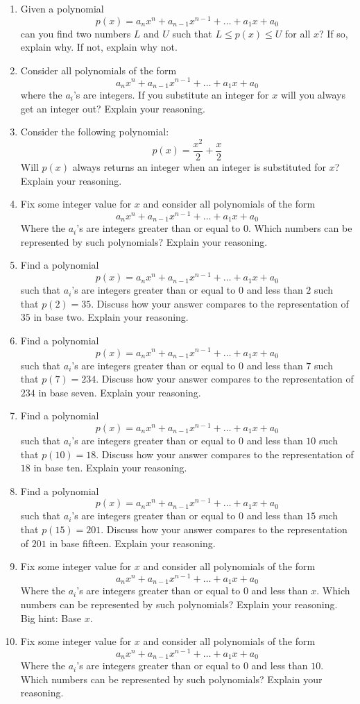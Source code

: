 \begin{problems}
\begin{enumerate}
\item Given a polynomial
\[
p(x) = a_nx^n + a_{n-1}x^{n-1} + \dots + a_1 x+ a_0
\]
can you find two numbers $L$ and $U$ such that $L \le p(x) \le U$ for
all $x$? If so, explain why. If not, explain why not.
\item Consider all polynomials of the form
\[
a_nx^n + a_{n-1}x^{n-1} + \dots + a_1 x+ a_0
\]
where the $a_i$'s are integers. If you substitute an integer for $x$
will you always get an integer out? Explain your reasoning.
\item Consider the following polynomial:
\[
p(x) = \frac{x^2}{2}+\frac{x}{2}
\]
Will $p(x)$ always returns an integer when an integer is substituted
for $x$? Explain your reasoning.

\item Fix some integer value for $x$ and consider all polynomials of
  the form
\[
a_nx^n + a_{n-1}x^{n-1} + \dots + a_1 x+ a_0
\]
Where the $a_i$'s are integers greater than or equal to $0$. Which
numbers can be represented by such polynomials? Explain your
reasoning.
\item Find a polynomial 
\[
p(x) = a_nx^n + a_{n-1}x^{n-1} + \dots + a_1 x+ a_0
\]
such that $a_i$'s are integers greater than or equal to $0$ and less
than $2$ such that $p(2) = 35$. Discuss how your answer compares to
the representation of $35$ in base two. Explain your reasoning.
\item Find a polynomial 
\[
p(x) = a_nx^n + a_{n-1}x^{n-1} + \dots + a_1 x+ a_0
\]
such that $a_i$'s are integers greater than or equal to $0$ and less
than $7$ such that $p(7) = 234$. Discuss how your answer compares to
the representation of $234$ in base seven. Explain your reasoning. 
\item Find a polynomial 
\[
p(x) = a_nx^n + a_{n-1}x^{n-1} + \dots + a_1 x+ a_0
\]
such that $a_i$'s are integers greater than or equal to $0$ and less
than $10$ such that $p(10) = 18$. Discuss how your answer compares to
the representation of $18$ in base ten. Explain your reasoning.
\item Find a polynomial 
\[
p(x) = a_nx^n + a_{n-1}x^{n-1} + \dots + a_1 x+ a_0
\]
such that $a_i$'s are integers greater than or equal to $0$ and less
than $15$ such that $p(15) = 201$. Discuss how your answer compares to
the representation of $201$ in base fifteen. Explain your reasoning.
\item Fix some integer value for $x$ and consider all polynomials of the form
\[
a_nx^n + a_{n-1}x^{n-1} + \dots + a_1 x+ a_0
\]
Where the $a_i$'s are integers greater than or equal to $0$ and less
than $x$. Which numbers can be represented by such polynomials?
Explain your reasoning. Big hint: Base $x$.
\item Fix some integer value for $x$ and consider all polynomials of
  the form
\[
a_nx^n + a_{n-1}x^{n-1} + \dots + a_1 x+ a_0
\]
Where the $a_i$'s are integers greater than or equal to $0$ and less
than $10$. Which numbers can be represented by such polynomials?
Explain your reasoning.


\end{enumerate}
\end{problems}
